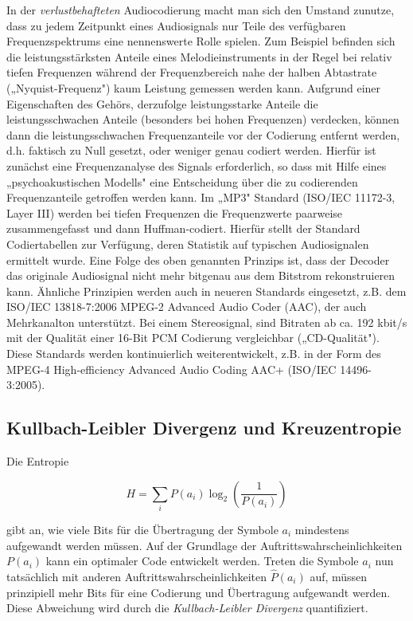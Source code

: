 In der \textit{verlustbehafteten} Audiocodierung macht man sich den Umstand zunutze, dass zu jedem Zeitpunkt eines Audiosignals nur Teile des verfügbaren Frequenzspektrums eine nennenswerte Rolle spielen. Zum Beispiel befinden sich die leistungsstärksten Anteile eines Melodieinstruments in der Regel bei relativ tiefen Frequenzen während der Frequenzbereich nahe der halben Abtastrate („Nyquist-Frequenz") kaum Leistung gemessen werden kann. Aufgrund einer Eigenschaften des Gehörs, derzufolge leistungsstarke Anteile die leistungsschwachen Anteile (besonders bei hohen Frequenzen) verdecken, können dann die leistungsschwachen Frequenzanteile vor der Codierung entfernt werden, d.h. faktisch zu Null gesetzt, oder weniger genau codiert werden. Hierfür ist zunächst eine Frequenzanalyse des Signals erforderlich, so dass mit Hilfe eines „psychoakustischen Modells" eine Entscheidung über die zu codierenden Frequenzanteile getroffen werden kann. Im „MP3" Standard (ISO/IEC 11172-3, Layer III) werden bei tiefen Frequenzen die Frequenzwerte paarweise zusammengefasst und dann Huffman-codiert. Hierfür stellt der Standard Codiertabellen zur Verfügung, deren Statistik auf typischen Audiosignalen ermittelt wurde. Eine Folge des oben genannten Prinzips ist, dass der Decoder das originale Audiosignal nicht mehr bitgenau aus dem Bitstrom rekonstruieren kann. Ähnliche Prinzipien werden auch in neueren Standards eingesetzt, z.B. dem ISO/IEC 13818-7:2006 MPEG-2 Advanced Audio Coder (AAC), der auch Mehrkanalton unterstützt. Bei einem Stereosignal, sind Bitraten ab ca. 192 kbit/s mit der Qualität einer 16-Bit PCM Codierung vergleichbar („CD-Qualität"). Diese Standards werden kontinuierlich weiterentwickelt, z.B. in der Form des MPEG-4 High-efficiency Advanced Audio Coding AAC+ (ISO/IEC 14496-3:2005).


\subsection{Kullbach-Leibler Divergenz und Kreuzentropie}
\label{sec:kullback-leibler}

Die Entropie

$$
H = \sum_i P(a_i) \log_2\!\left(\frac{1}{P(a_i)}\right)
$$

gibt an, wie viele Bits für die Übertragung der Symbole $a_i$ mindestens aufgewandt werden müssen. Auf der Grundlage der Auftrittswahrscheinlichkeiten $P(a_i)$ kann ein optimaler Code entwickelt werden. Treten die Symbole $a_i$ nun tatsächlich mit anderen Auftrittswahrscheinlichkeiten $\widehat{P}(a_i)$ auf, müssen prinzipiell mehr Bits für eine Codierung und Übertragung aufgewandt werden. Diese Abweichung wird durch die \textit{Kullbach-Leibler Divergenz} quantifiziert.

